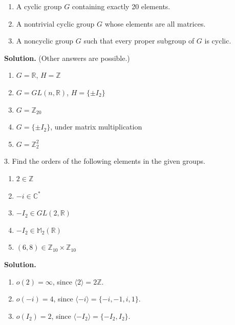 \documentclass[10pt,]{book}
\theoremstyle{plain}
\theoremstyle{definition}
\theoremstyle{definition}
\theoremstyle{definition}
\theoremstyle{definition}
\numberwithin{equation}{section}
\def\Z{\mathbb{Z}}
\def\R{\mathbb{R}}
\def\C{\mathbb{C}}
\def\M{\mathbb{M}}
\begin{document}
\begin{exerciselist}
\begin{enumerate}[label=(\alph*)]
\item\hypertarget{li-278}{}A cyclic group \(G\) containing exactly 20 elements.%
\item\hypertarget{li-279}{}A nontrivial cyclic group \(G\) whose elements are all matrices.%
\item\hypertarget{li-280}{}A noncyclic group \(G\) such that every proper subgroup of \(G\) is cyclic.%
\end{enumerate}
%
\par\smallskip
\par\smallskip
\noindent\textbf{Solution.}\hypertarget{solution-35}{}\quad
(Other answers are possible.) \leavevmode%
\begin{enumerate}[label=(\alph*)]
\item\hypertarget{li-281}{}\(G=\R\), \(H=\Z\)%
\item\hypertarget{li-282}{}\(G=GL(n,\R)\), \(H=\{\pm I_2\}\)%
\item\hypertarget{li-283}{}\(G=\Z_{20}\)%
\item\hypertarget{li-284}{}\(G=\{\pm I_2\}\), under matrix multiplication%
\item\hypertarget{li-285}{}\(G=\Z_2^2\)%
\end{enumerate}
%
\item[3.]\hypertarget{exercise-36}{}Find the orders of the following elements in the given groups. \leavevmode%
\begin{enumerate}[label=(\alph*)]
\item\hypertarget{li-286}{}\(2\in \Z\)%
\item\hypertarget{li-287}{}\(-i\in \C^*\)%
\item\hypertarget{li-288}{}\(-I_2\in GL(2,\R)\)%
\item\hypertarget{li-289}{}\(-I_2\in \M_2(\R)\)%
\item\hypertarget{li-290}{}\((6,8)\in \Z_{10}\times \Z_{10}\)%
\end{enumerate}
%
\par\smallskip
\par\smallskip
\noindent\textbf{Solution.}\hypertarget{solution-36}{}\quad
\leavevmode%
\begin{enumerate}[label=(\alph*)]
\item\hypertarget{li-291}{}\(o(2)=\infty\), since \(\langle 2\rangle =2\Z\).%
\item\hypertarget{li-292}{}\(o(-i)=4\), since \(\langle -i\rangle =\{-i,-1,i,1\}\).%
\item\hypertarget{li-293}{}\(o(I_2)=2\), since \(\langle -I_2\rangle =\{-I_2,I_2\}\).%

\end{enumerate}
\end{exerciselist}
\end{document}
